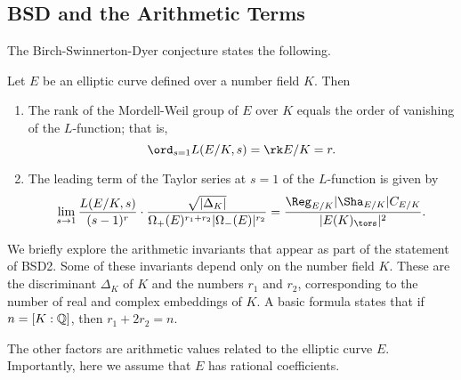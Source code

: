 \subsection{BSD and the Arithmetic Terms}\label{sec-explain-terms}

The Birch-Swinnerton-Dyer conjecture states the following.

\begin{conj}[BSD]
    Let $E$ be an elliptic curve defined over a number field $K$. Then 
    \begin{enumerate}[label={\bfseries  BSD\arabic*.}]
        \item The rank of the Mordell-Weil group of $E$ over $K$ equals the order of vanishing of the $L$-function; that is,
        $$\ord_{s=1}L(E/K,s)=\rk E/K = r.$$
        \item The leading term of the Taylor series at $s=1$ of the $L$-function is given by 
        \begin{equation}\label{BSD_2}
            \lim_{s\to1}\frac{L(E/K,s)}{(s-1)^r}\cdot\frac{\sqrt{|\Delta_K|}}{\Omega_+(E)^{r_1+r_2}|\Omega_-(E)|^{r_2}}=\frac{\Reg_{E/K}|\Sha_{E/K}|C_{E/K}}{|E(K)_{\tors}|^2}.
        \end{equation}
    \end{enumerate}
\end{conj}

We briefly explore the arithmetic invariants that appear as part of the statement of BSD2. Some of these invariants depend only on the number field $K$. These are the discriminant $\Delta_K$ of $K$ and the numbers $r_1$ and $r_2$, corresponding to the number of real and complex embeddings of $K$. A basic formula states that if $n=[K:\mathbb{Q}]$, then $r_1+2r_2=n$. 

The other factors are arithmetic values related to the elliptic curve $E$. Importantly, here we assume that $E$ has rational coefficients.

